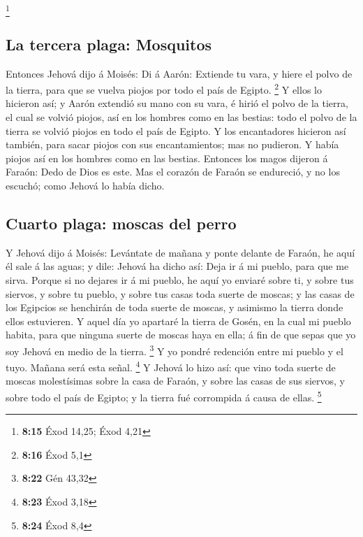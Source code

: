 \footnote{\textbf{8:15} Éxod 14,25; Éxod 4,21}

\hypertarget{la-tercera-plaga-mosquitos}{%
\subsection{La tercera plaga:
Mosquitos}\label{la-tercera-plaga-mosquitos}}

 Entonces Jehová dijo á Moisés: Di á Aarón: Extiende tu
vara, y hiere el polvo de la tierra, para que se vuelva piojos por todo
el país de Egipto. \footnote{\textbf{8:16} Éxod 5,1}  Y
ellos lo hicieron así; y Aarón extendió su mano con su vara, é hirió el
polvo de la tierra, el cual se volvió piojos, así en los hombres como en
las bestias: todo el polvo de la tierra se volvió piojos en todo el país
de Egipto.  Y los encantadores hicieron así también, para
sacar piojos con sus encantamientos; mas no pudieron. Y había piojos así
en los hombres como en las bestias.  Entonces los magos
dijeron á Faraón: Dedo de Dios es este. Mas el corazón de Faraón se
endureció, y no los escuchó; como Jehová lo había dicho.

\hypertarget{cuarto-plaga-moscas-del-perro}{%
\subsection{Cuarto plaga: moscas del
perro}\label{cuarto-plaga-moscas-del-perro}}

 Y Jehová dijo á Moisés: Levántate de mañana y ponte
delante de Faraón, he aquí él sale á las aguas; y dile: Jehová ha dicho
así: Deja ir á mi pueblo, para que me sirva.  Porque si
no dejares ir á mi pueblo, he aquí yo enviaré sobre ti, y sobre tus
siervos, y sobre tu pueblo, y sobre tus casas toda suerte de moscas; y
las casas de los Egipcios se henchirán de toda suerte de moscas, y
asimismo la tierra donde ellos estuvieren.  Y aquel día
yo apartaré la tierra de Gosén, en la cual mi pueblo habita, para que
ninguna suerte de moscas haya en ella; á fin de que sepas que yo soy
Jehová en medio de la tierra. \footnote{\textbf{8:22} Gén 43,32}
 Y yo pondré redención entre mi pueblo y el tuyo. Mañana
será esta señal. \footnote{\textbf{8:23} Éxod 3,18}  Y
Jehová lo hizo así: que vino toda suerte de moscas molestísimas sobre la
casa de Faraón, y sobre las casas de sus siervos, y sobre todo el país
de Egipto; y la tierra fué corrompida á causa de ellas. \footnote{\textbf{8:24}
  Éxod 8,4}

